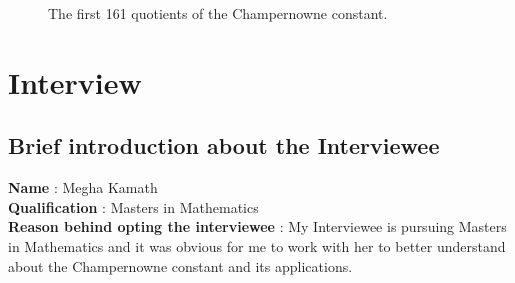 \documentclass[12pt, a4paper]{report}
\begin{document}
\begin{figure}
    \centering
    \caption{The first 161 quotients of the Champernowne constant.}
    \label{fig:The first 161 quotients of the Champernowne constant.}
\end{figure}

\chapter{Interview}
\label{Chap2}
\section{Brief introduction about the Interviewee}
{\bf Name} : Megha Kamath \\
{\bf Qualification} : Masters in Mathematics \\
{\bf Reason behind opting the interviewee} : My Interviewee is pursuing Masters in Mathematics and it was obvious for me to work with her to better understand about the Champernowne constant and its applications.
\end{document}
